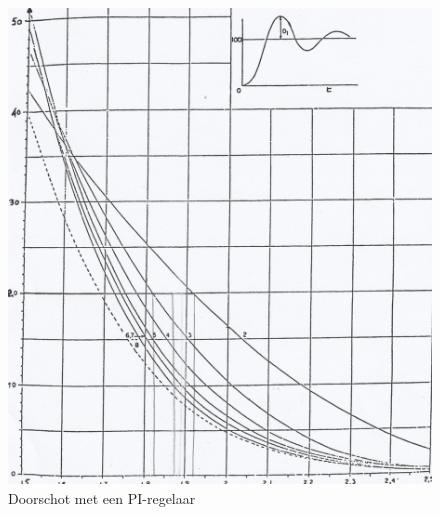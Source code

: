 \documentclass[a4paper, 12pt]{article}
\begin{document}
\begin{figure}[H]	
	\includegraphics[width=1\linewidth]{Labo2_2_1.jpg}
	\caption{Doorschot met een PI-regelaar}
	\label{fig:fig2_2_1}
\end{figure}
\end{document}
